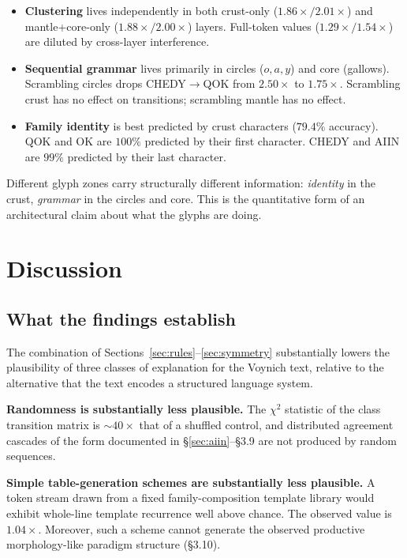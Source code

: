 \documentclass[11pt]{article}
\begin{document}
\begin{itemize}
  \item \textbf{Clustering} lives independently in both crust-only
        ($1.86\times/2.01\times$) and mantle+core-only
        ($1.88\times/2.00\times$) layers. Full-token values ($1.29\times/1.54\times$)
        are diluted by cross-layer interference.
  \item \textbf{Sequential grammar} lives primarily in circles
        ($o, a, y$) and core (gallows). Scrambling circles drops
        CHEDY$\to$QOK from $2.50\times$ to $1.75\times$. Scrambling crust
        has no effect on transitions; scrambling mantle has no effect.
  \item \textbf{Family identity} is best predicted by crust characters
        ($79.4\%$ accuracy). QOK and OK are $100\%$ predicted by their
        first character. CHEDY and AIIN are $99\%$ predicted by their last
        character.
\end{itemize}

Different glyph zones carry structurally different information:
\emph{identity} in the crust, \emph{grammar} in the circles and core.
This is the quantitative form of an architectural claim about what the
glyphs are doing.

\section{Discussion}
\label{sec:discussion}

\subsection{What the findings establish}

The combination of Sections~\ref{sec:rules}--\ref{sec:symmetry} substantially
lowers the plausibility of three classes of explanation for the Voynich text,
relative to the alternative that the text encodes a structured language
system.

\textbf{Randomness is substantially less plausible.} The $\chi^2$ statistic
of the class transition matrix is $\sim\!40\times$ that of a shuffled
control, and distributed agreement cascades of the form documented in
\S\ref{sec:aiin}--\S3.9 are not produced by random sequences.

\textbf{Simple table-generation schemes are substantially less plausible.}
A token stream drawn from a fixed family-composition template library
would exhibit whole-line template recurrence well above chance. The
observed value is $1.04\times$. Moreover, such a scheme cannot generate
the observed productive morphology-like paradigm structure (\S3.10).
\end{document}
